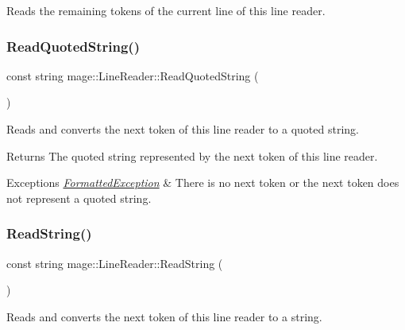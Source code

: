 Reads the remaining tokens of the current line of this line reader. \hypertarget{classmage_1_1_line_reader_ae9a7547d01b29c3237b198444d4f3aef}{}\label{classmage_1_1_line_reader_ae9a7547d01b29c3237b198444d4f3aef} 
\subsubsection{\texorpdfstring{Read\+Quoted\+String()}{ReadQuotedString()}}
{\footnotesize\ttfamily const string mage\+::\+Line\+Reader\+::\+Read\+Quoted\+String (\begin{DoxyParamCaption}{ }\end{DoxyParamCaption})\hspace{0.3cm}{\ttfamily [protected]}}

Reads and converts the next token of this line reader to a quoted string.

\begin{DoxyReturn}{Returns}
The quoted string represented by the next token of this line reader. 
\end{DoxyReturn}

\begin{DoxyExceptions}{Exceptions}
{\em \hyperlink{structmage_1_1_formatted_exception}{Formatted\+Exception}} & There is no next token or the next token does not represent a quoted string. \\
\hline
\end{DoxyExceptions}
\hypertarget{classmage_1_1_line_reader_a58a27b637574ce56ea17a575aa540675}{}\label{classmage_1_1_line_reader_a58a27b637574ce56ea17a575aa540675} 
\subsubsection{\texorpdfstring{Read\+String()}{ReadString()}}
{\footnotesize\ttfamily const string mage\+::\+Line\+Reader\+::\+Read\+String (\begin{DoxyParamCaption}{ }\end{DoxyParamCaption})\hspace{0.3cm}{\ttfamily [protected]}}

Reads and converts the next token of this line reader to a string.

